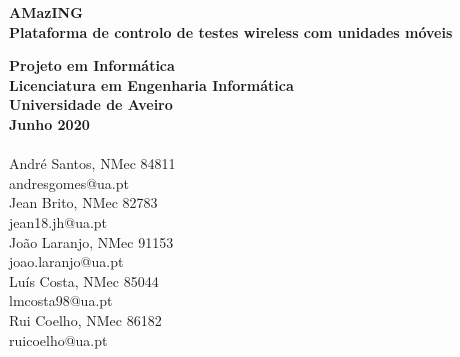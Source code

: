 \thispagestyle{empty} %
\vspace*{\fill}
\sffamily

\Large{
\noindent
\textbf{AMazING}\\
\textbf{Plataforma de controlo de testes wireless com unidades móveis}\\
}

\small
\noindent
\textbf{Projeto em Informática}\\
\textbf{Licenciatura em Engenharia Informática}\\
\textbf{Universidade de Aveiro}\\
\textbf{Junho 2020}\\
\\
André Santos, NMec 84811\\
andresgomes@ua.pt\\
Jean Brito, NMec 82783\\
jean18.jh@ua.pt\\
João Laranjo, NMec 91153\\
joao.laranjo@ua.pt\\
Luís Costa, NMec 85044\\
lmcosta98@ua.pt\\
Rui Coelho, NMec 86182\\
ruicoelho@ua.pt
\normalsize
\normalfont
\vspace*{2.5cm}
